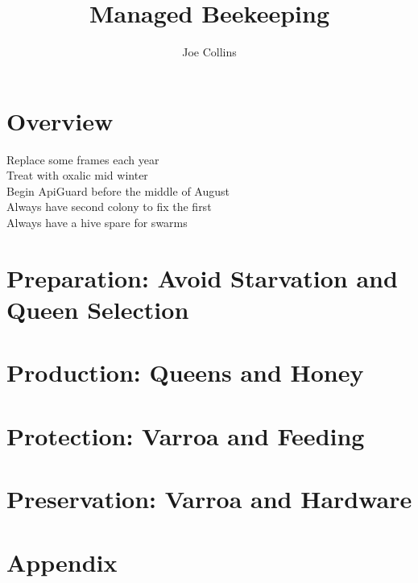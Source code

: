 \documentclass{./BeekeepingBook}
\title{Managed Beekeeping}
\author{Joe Collins}
\date{\DTMnow}
\begin{document}
 
\maketitle
\tableofcontents

\chapter{Overview}

\begin{description}
  \item[Replace some frames each year]
  \item[Treat with oxalic mid winter]
  \item[Begin ApiGuard before the middle of August]
  \item[Always have second colony to fix the first]
  \item[Always have a hive spare for swarms]
\end{description}


\chapter{Preparation: Avoid Starvation and Queen Selection}



\chapter{Production: Queens and Honey}



 
\chapter{Protection: Varroa and Feeding}




\chapter{Preservation: Varroa and Hardware}





\appendix
\chapter{Appendix}
\end{document}
